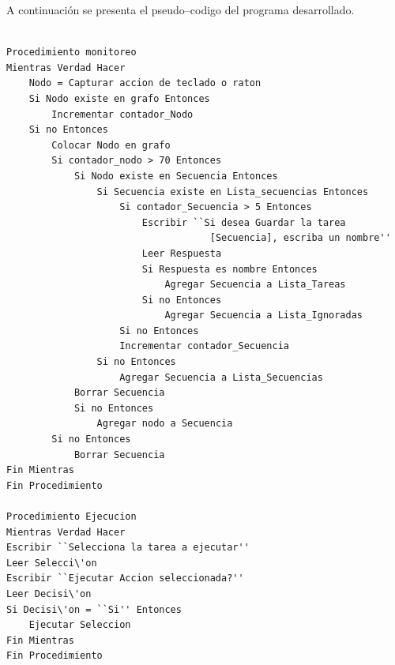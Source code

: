 A continuaci\'on se presenta el pseudo--codigo del programa desarrollado.


\begin{table}[]

\begin{lstlisting}

Procedimiento monitoreo
Mientras Verdad Hacer
    Nodo = Capturar accion de teclado o raton
    Si Nodo existe en grafo Entonces
        Incrementar contador_Nodo
    Si no Entonces
        Colocar Nodo en grafo
        Si contador_nodo > 70 Entonces
            Si Nodo existe en Secuencia Entonces
                Si Secuencia existe en Lista_secuencias Entonces
                    Si contador_Secuencia > 5 Entonces
                        Escribir ``Si desea Guardar la tarea 
                                    [Secuencia], escriba un nombre''
                        Leer Respuesta
                        Si Respuesta es nombre Entonces
                            Agregar Secuencia a Lista_Tareas
                        Si no Entonces 
                            Agregar Secuencia a Lista_Ignoradas
                    Si no Entonces
                    Incrementar contador_Secuencia
                Si no Entonces
                    Agregar Secuencia a Lista_Secuencias
            Borrar Secuencia
            Si no Entonces
                Agregar nodo a Secuencia
		Si no Entonces
            Borrar Secuencia
Fin Mientras
Fin Procedimiento 

Procedimiento Ejecucion
Mientras Verdad Hacer
Escribir ``Selecciona la tarea a ejecutar''
Leer Selecci\'on
Escribir ``Ejecutar Accion seleccionada?''
Leer Decisi\'on
Si Decisi\'on = ``Si'' Entonces
	Ejecutar Seleccion
Fin Mientras
Fin Procedimiento

\end{lstlisting}

\end{table}
